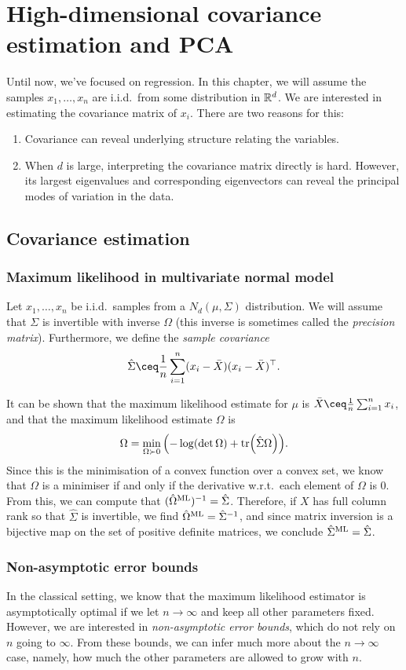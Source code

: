 \section{High-dimensional covariance estimation and PCA}
Until now, we've focused on regression. In this chapter, we will assume the samples $x_1, \dotsc, x_n$ are i.i.d.\ from some distribution in $\mathbb R^d$. We are interested in estimating the covariance matrix of $x_i$. There are two reasons for this:
\begin{enumerate}
	\item Covariance can reveal underlying structure relating the variables.
	\item When $d$ is large, interpreting the covariance matrix directly is hard. However, its largest eigenvalues and corresponding eigenvectors can reveal the principal modes of variation in the data. 
\end{enumerate}

\subsection{Covariance estimation}
\subsubsection{Maximum likelihood in multivariate normal model}
Let $x_1, \dotsc, x_n$ be i.i.d.\ samples from a $N_d(\mu, \Sigma)$ distribution. We will assume that $\Sigma$ is invertible with inverse $\Omega$ (this inverse is sometimes called the \emph{precision matrix}). Furthermore, we define the \emph{sample covariance} \[
\hat\Sigma \ceq \frac1n \sum_{i=1}^n (x_i - \bar X)(x_i - \bar X)\T. 
\]

It can be shown that the maximum likelihood estimate for $\mu$ is $\bar X \ceq \frac1n \sum_{i=1}^n x_i$, and that the maximum likelihood estimate $\Omega$ is
\[
\Omega = \min_{\Omega \succ 0} \qty(-\log(\det\Omega) + \tr(\hat\Sigma\Omega)). 
\]
Since this is the minimisation of a convex function over a convex set, we know that $\Omega$ is a minimiser if and only if the derivative w.r.t.\ each element of $\Omega$ is 0. From this, we can compute that $(\hat\Omega^\mathrm{ML})^{-1} = \hat\Sigma$. Therefore, if $X$ has full column rank so that $\hat\Sigma$ is invertible, we find $\hat\Omega^\mathrm{ML} = \hat\Sigma^{-1}$, and since matrix inversion is a bijective map on the set of positive definite matrices, we conclude $\hat\Sigma^\mathrm{ML} = \hat\Sigma$. 

\subsubsection{Non-asymptotic error bounds}
In the classical setting, we know that the maximum likelihood estimator is asymptotically optimal if we let $n \to \infty$ and keep all other parameters fixed. However, we are interested in \emph{non-asymptotic error bounds}, which do not rely on $n$ going to $\infty$. From these bounds, we can infer much more about the $n\to\infty$ case, namely, how much the other parameters are allowed to grow with $n$. 

